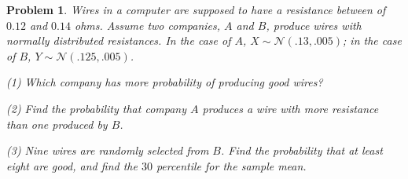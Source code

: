 \documentclass[a4paper, 12pt]{article}
\newtheorem{problem}{Problem}
\newtheorem{problem}{Problem}
\begin{document}
\pagebreak

\begin{problem}
    Wires in a computer are supposed to have a resistance between of $0.12$ and
    $0.14$ ohms. Assume two companies, $A$ and $B$, produce wires with normally
    distributed resistances. In the case of $A$, $X \sim \mathcal{N}(.13,
    .005)$; in the case of $B$, $Y \sim \mathcal{N}(.125, .005)$.

    \textit{(1)} Which company has more probability of producing good wires? 

    \textit{(2)} Find the probability that company $A$ produces a wire with more
    resistance than one produced by $B$.

    \textit{(3)} Nine wires are randomly selected from $B$. Find the probability
    that \textit{at least} eight are good, and find the $30$ percentile for the
    sample mean.
\end{problem}
\end{document}
